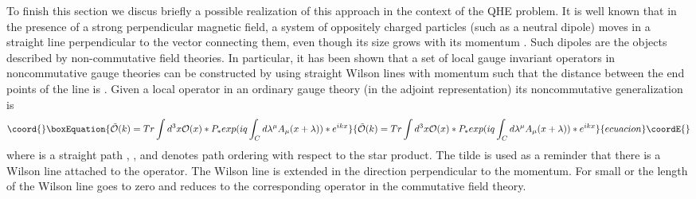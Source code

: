 \documentclass[a4paper,12pt]{article}
\begin{document}
To finish this section we discus briefly a possible realization of
this approach in the context of the QHE problem.  It is well known
that in the presence of a strong perpendicular magnetic field, a
system of oppositely charged particles (such as a neutral dipole)
moves in a straight line perpendicular to the vector connecting
them,
even though its size grows with its momentum \cite{bs}. Such
dipoles
are the objects described by non-commutative field theories. In
particular, it has been shown that a set of local gauge invariant
operators in noncommutative gauge theories can be constructed by
using
straight Wilson lines with momentum \coordHE{} such that the distance
between the end points of the line is \coordHE{}
\cite{GHI,IIKK}. Given a local operator \coordHE{} in an
ordinary
gauge theory (in the adjoint representation) its noncommutative
generalization is~\cite{GHI}
\begin{equation}\coord{}\boxEquation{
{\tilde{\cal O}}(k) = Tr \int d^3x {\cal O}(x) * P_* exp (iq \int_C
d\lambda^\mu 
A_\mu(x+\lambda) ) * e^{ikx}
}{
{\tilde{\cal O}}(k) = Tr \int d^3x {\cal O}(x) * P_* exp (iq \int_C
d\lambda^\mu 
A_\mu(x+\lambda) ) * e^{ikx}
}{ecuacion}\coordE{}\end{equation}
where \coordHE{} is a straight path \coordHE{}, \coordHE{},
and \coordHE{} denotes path ordering with respect to the star product.
The
tilde is used as a reminder that there is a Wilson line attached to
the operator.  The Wilson line is extended in the direction
perpendicular to the momentum. For small \coordHE{} or \myHighlight{$\theta$}\coordHE{} the length
of the
Wilson line goes to zero and \coordHE{} reduces to the
corresponding operator in the commutative field theory.
\end{document}
